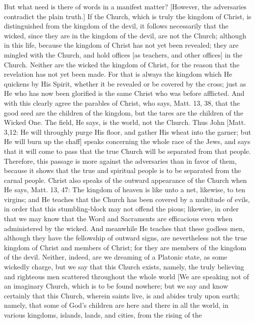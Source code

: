 But what need is there of words in a manifest matter?  [However, the
adversaries contradict the plain truth.] If the Church, which is
truly the kingdom of Christ, is distinguished from the kingdom of the
devil, it follows necessarily that the wicked, since they are in the
kingdom of the devil, are not the Church; although in this life,
because the kingdom of Christ has not yet been revealed; they are
mingled with the Church, and hold offices [as teachers, and other
offices] in the Church.  Neither are the wicked the kingdom of Christ,
for the reason that the revelation has not yet been made.  For that
is always the kingdom which He quickens by His Spirit, whether it be
revealed or be covered by the cross; just as He who has now been
glorified is the same Christ who was before afflicted.  And with this
clearly agree the parables of Christ, who says, Matt. 13, 38, that
the good seed are the children of the kingdom, but the tares are the
children of the Wicked One.  The field, He says, is the world, not
the Church.  Thus John [Matt. 3,12: He will throughly purge His floor,
and gather His wheat into the garner; but He will burn up the chaff]
speaks concerning the whole race of the Jews, and says that it will
come to pass that the true Church will be separated from that people.
Therefore, this passage is more against the adversaries than in
favor of them, because it shows that the true and spiritual people is
to be separated from the carnal people.  Christ also speaks of the
outward appearance of the Church when He says, Matt. 13, 47: The
kingdom of heaven is like unto a net, likewise, to ten virgins; and
He teaches that the Church has been covered by a multitude of evils,
in order that this stumbling-block may not offend the pious; likewise,
in order that we may know that the Word and Sacraments are
efficacious even when administered by the wicked.  And meanwhile He
teaches that these godless men, although they have the fellowship of
outward signs, are nevertheless not the true kingdom of Christ and
members of Christ; for they are members of the kingdom of the devil.
Neither, indeed, are we dreaming of a Platonic state, as some
wickedly charge, but we say that this Church exists, namely, the
truly believing and righteous men scattered throughout the whole
world [We are speaking not of an imaginary Church, which is to be
found nowhere; but we say and know certainly that this Church,
wherein saints live, is and abides truly upon earth; namely, that
some of God's children are here and there in all the world, in
various kingdoms, islands, lands, and cities, from the rising of the

